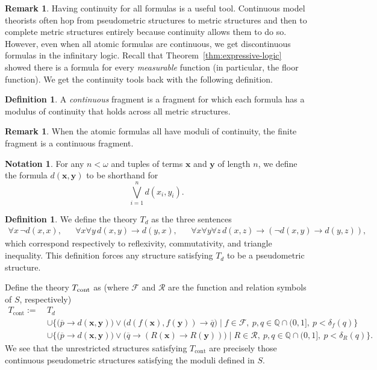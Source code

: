 \documentclass{amsart}
\theoremstyle{definition}
\newtheorem{remark}[theorem]{Remark}
\newtheorem{definition}[theorem]{Definition}
\newtheorem{notation}[theorem]{Notation}
\numberwithin{equation}{theorem}
\newcommand{\Q}{\mathbb{Q}}
\newcommand{\V}{\mathbf}
\newcommand{\where}{\mid}
\newcommand{\rat}[1]{{\overline{#1}}}
\newcommand{\narrow}[1]{\xrightarrow{#1}}
\renewcommand{\to}{\narrow{}}
\begin{document}
\begin{remark}
  Having continuity for all formulas is a useful tool.
  Continuous model theorists often hop from pseudometric structures to metric structures and then to complete metric structures entirely because continuity allows them to do so.
  However, even when all atomic formulas are continuous, we get discontinuous formulas in the infinitary logic.
  Recall that Theorem~\ref{thm:expressive-logic} showed there is a formula for every \emph{measurable} function (in particular, the floor function).
  We get the continuity tools back with the following definition.
\end{remark}
\begin{definition}
  A \emph{continuous} fragment is a fragment for which each formula has a modulus of continuity that holds across all metric structures.
\end{definition}
\begin{remark}
  When the atomic formulas all have moduli of continuity, the finite fragment is a continuous fragment.
\end{remark}
\begin{notation}
  For any $n<\omega$ and tuples of terms $\V x$ and $\V y$ of length $n$, we define the formula $d(\V x, \V y)$ to be shorthand for
  \[
    \bigvee_{i=1}^nd(x_i, y_i).
  \]
\end{notation}
\begin{definition}
  We define the theory $T_d$ as the three sentences
  \begin{align*}
    \forall x\,\neg d(x, x),&&
    \forall x\forall y\,d(x, y)\to d(y, x),&&
    \forall x\forall y\forall z\,d(x, z)\to(\neg d(x, y)\to d(y, z)),
  \end{align*}
  which correspond respectively to reflexivity, commutativity, and triangle inequality.
  This definition forces any structure satisfying $T_d$ to be a pseudometric structure.
  
  Define the theory ${T_\text{cont}}$ as (where $\mathscr F$ and $\mathscr R$ are the function and relation symbols of $S$, respectively)
  \begin{align*}
    T_\text{cont}:=\ &T_d\\
    &\cup\Big\{\Big(\rat p\to d(\V x, \V y)\Big)\vee \Big(d(f(\V x), f(\V y))\to\rat q\Big)\where f\in\mathscr F,\ p,q\in\Q\cap(0,1],\ p<\delta_f(q)\}\\
    &\cup\Big\{\Big(\rat p\to d(\V x, \V y)\Big)\vee \Big(\rat q\to (R(\V x)\to R(\V y))\Big)\where R\in\mathscr R,\ p,q\in\Q\cap(0,1],\ p<\delta_R(q)\}.
  \end{align*}
  We see that the unrestricted structures satisfying $T_\text{cont}$ are precisely those continuous pseudometric structures satisfying the moduli defined in $S$.
\end{definition}
\end{document}
